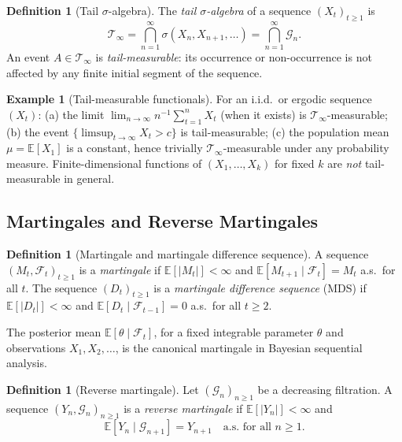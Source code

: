 \documentclass[bj,authoryear]{imsart}
\theoremstyle{plain}
\theoremstyle{definition}
\newtheorem{definition}[theorem]{Definition}
\newtheorem{example}[theorem]{Example}
\newcommand{\E}{\mathbb{E}}
\newcommand{\F}{\mathcal{F}}
\newcommand{\G}{\mathcal{G}}
\newcommand{\Tsig}{\mathcal{T}_\infty}
\newcommand{\abs}[1]{\left| #1 \right|}
\newcommand{\given}{\mid}
\begin{document}
\begin{definition}[Tail $\sigma$-algebra]
\label{def:tail}
  The \emph{tail $\sigma$-algebra} of a sequence $(X_t)_{t\geq 1}$ is
  \[
    \Tsig = \bigcap_{n=1}^\infty \sigma(X_n, X_{n+1}, \ldots)
           = \bigcap_{n=1}^\infty \G_n.
  \]
  An event $A \in \Tsig$ is \emph{tail-measurable}: its occurrence or
  non-occurrence is not affected by any finite initial segment of the sequence.
\end{definition}

\begin{example}[Tail-measurable functionals]
  For an i.i.d.\ or ergodic sequence $(X_t)$:
  (a) the limit $\lim_{n\to\infty} n^{-1}\sum_{t=1}^n X_t$ (when it exists)
      is $\Tsig$-measurable;
  (b) the event $\{\limsup_{t\to\infty} X_t > c\}$ is tail-measurable;
  (c) the population mean $\mu = \E[X_1]$ is a constant, hence trivially
      $\Tsig$-measurable under any probability measure.
  Finite-dimensional functions of $(X_1,\ldots,X_k)$ for fixed $k$ are
  \emph{not} tail-measurable in general.
\end{example}

\subsection{Martingales and Reverse Martingales}

\begin{definition}[Martingale and martingale difference sequence]
\label{def:martingale}
  A sequence $(M_t, \F_t)_{t\geq 1}$ is a \emph{martingale} if
  $\E[\abs{M_t}] < \infty$ and $\E[M_{t+1}\given\F_t] = M_t$ a.s.\ for all $t$.
  The sequence $(D_t)_{t\geq 1}$ is a \emph{martingale difference sequence} (MDS)
  if $\E[\abs{D_t}] < \infty$ and $\E[D_t\given\F_{t-1}] = 0$ a.s.\ for all $t\geq 2$.
\end{definition}

The posterior mean $\E[\theta\given\F_t]$, for a fixed integrable parameter
$\theta$ and observations $X_1, X_2, \ldots$, is the canonical martingale in
Bayesian sequential analysis.

\begin{definition}[Reverse martingale]
\label{def:reverse-mg}
  Let $(\G_n)_{n\geq 1}$ be a decreasing filtration.
  A sequence $(Y_n, \G_n)_{n\geq 1}$ is a \emph{reverse martingale} if
  $\E[\abs{Y_n}] < \infty$ and
  \[
    \E[Y_n \given \G_{n+1}] = Y_{n+1} \quad \text{a.s.\ for all } n\geq 1.
  \]
\end{definition}
\end{document}
